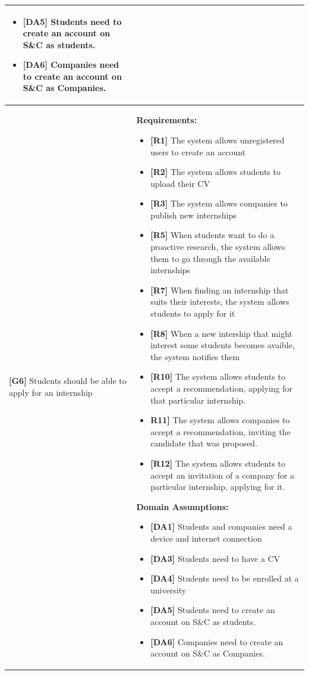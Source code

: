 \begin{longtable}{|p{}|p{}|}
\begin{itemize}
    \item \textbf{[DA5]} Students need to create an account on S\&C as students.
    \item \textbf{[DA6]} Companies need to create an account on S\&C as Companies.
\end{itemize} \\
\hline
\hline
\textbf{[G6]}  Students should be able to apply for an internship
& 
\textbf{Requirements:}
\begin{itemize}
    \item \textbf{[R1]} The system allows unregistered users to create an account
    \item \textbf{[R2]} The system allows students to upload their CV
    \item \textbf{[R3]} The system allows companies to publish new internships
    \item \textbf{[R5]} When students want to do a proactive research, the system allows them to go through the available internships
    \item \textbf{[R7]} When finding an internship that suits their interests, the system allows students to apply for it
    \item  \textbf{[R8]} When a new intership that might interest some students becomes avaible, the system notifies them
    \item  \textbf{[R10]} The system allows students to accept a recommendation, applying for that particular internship.
    \item  \textbf{R11]} The system allows companies to accept a recommendation, inviting the candidate that was proposed.
    \item \textbf{[R12]} The system allows students to accept an invitation of a company for a particular internship, applying for it.
\end{itemize}
\textbf{Domain Assumptions:}
\begin{itemize}
     \item \textbf{[DA1]} Students and companies need a device and internet connection
     \item \textbf{[DA3]} Students need to have a CV
     \item \textbf{[DA4]} Students need to be enrolled at a university
    \item \textbf{[DA5]} Students need to create an account on S\&C as students.
    \item \textbf{[DA6]} Companies need to create an account on S\&C as Companies.
\end{itemize} \\
\hline


\end{longtable}
